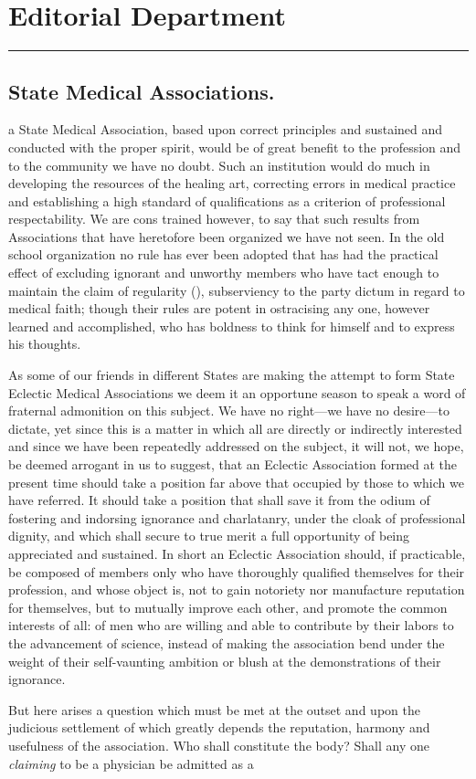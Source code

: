 \chapter{Editorial Department}

\fancybreak{*}

\section*{State Medical Associations.}

 a State Medical Association, based upon correct principles and
sustained and conducted with the proper spirit, would be of great benefit
to the profession and to the community we have no doubt. Such an
institution would do much in developing the resources of the healing
art, correcting errors in medical practice and establishing a high standard
of qualifications as a criterion of professional respectability. We
are cons trained however, to say that such results from Associations that
have heretofore been organized we have not seen. In the old school
organization no rule has ever been adopted that has had the practical
effect of excluding ignorant and unworthy members who have tact
enough to maintain the claim of regularity (), subserviency to the
party dictum in regard to medical faith; though their rules are potent
in ostracising any one, however learned and accomplished, who has boldness
to think for himself and to express his thoughts.

As some of our friends in different States are making the attempt to
form State Eclectic Medical Associations we deem it an opportune
season to speak a word of fraternal admonition on this subject. We
have no right---we have no desire---to dictate, yet since this is a matter
in which all are directly or indirectly interested and since we have been
repeatedly addressed on the subject, it will not, we hope, be deemed
arrogant in us to suggest, that an Eclectic Association formed at the
present time should take a position far above that occupied by those
to which we have referred. It should take a position that shall save
it from the odium of fostering and indorsing ignorance and charlatanry,
under the cloak of professional dignity, and which shall secure to true
merit a full opportunity of being appreciated and sustained. In short
an Eclectic Association should, if practicable, be composed of members
only who have thoroughly qualified themselves for their profession, and
whose object is, not to gain notoriety nor manufacture reputation for
themselves, but to mutually improve each other, and promote the common
interests of all: of men who are willing and able to contribute by
their labors to the advancement of science, instead of making the
association bend under the weight of their self-vaunting ambition or
blush at the demonstrations of their ignorance.

But here arises a question which must be met at the outset and
upon the judicious settlement of which greatly depends the reputation,
harmony and usefulness of the association. Who shall constitute the
body?  Shall any one \emph{claiming} to be a physician be admitted as a\endinput
